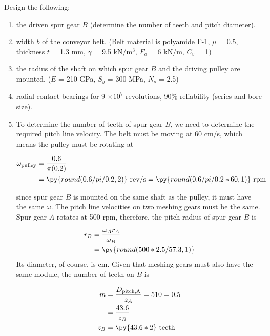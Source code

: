 \documentclass[a4paper,openany]{tufte-book}
\begin{document}
Design the following:

\begin{enumerate}
\item the driven spur gear \(B\) (determine the number of teeth and pitch
diameter).

\item width \(b\) of the conveyor belt. (Belt material is polyamide F-1,
\(\mu\) = 0.5, thickness \(t\) = 1.3 mm, \(\gamma\) = 9.5
kN/m\(^{3}\), \(F_{a}\) = 6 kN/m, \(C_{v}\) = 1)

\item the radius of the shaft on which spur gear \(B\) and the driving
pulley are mounted. (\(E\) = 210 GPa, \(S_{y}\) = 300 MPa, \(N_{s}\)
= 2.5)

\item radial contact bearings for 9 \(\times 10^{7}\) revolutions, 90\%
reliability (series and bore size).

\item To determine the number of teeth of spur gear \(B\), we need to
determine the required pitch line velocity. The belt must be moving
at 60 cm/s, which means the pulley must be rotating at

\begin{align}
  \omega_{\text{pulley}} &= \frac{0.6}{\pi (0.2)} \\
                         &= \py{round(0.6/pi/0.2,2)} \text{ rev/s} = \py{round(0.6/pi/0.2*60,1)} \text{ rpm}
\end{align}

since spur gear \(B\) is mounted on the same shaft as the pulley, it
must have the same \(\omega\). The pitch line velocities on two
meshing gears must be the same. Spur gear \(A\) rotates at 500 rpm,
therefore, the pitch radius of spur gear \(B\) is

\begin{align}
            r_{B} &= \frac{\omega_{A} r_{A}}{\omega_{B}} \\
                       &= \py{round(500*2.5/57.3,1)}
          \end{align} Its diameter, of course, is cm. Given that
meshing gears must also have the same module, the number of teeth on
\(B\) is

\begin{align}
            m &= \frac{D_{\text{pitch,A}}}{z_{A}} = {5}{10} = 0.5 \\
              &= \frac{43.6}{z_{B}} \\
            z_{B} &= \py{43.6*2} \text{ teeth}
          \end{align}


\end{enumerate}
\end{document}
